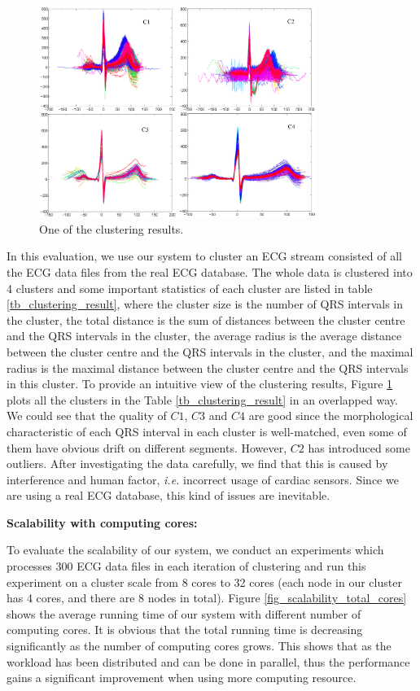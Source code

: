 \documentclass[conference]{IEEEtran}
\begin{document}
\begin{figure}[!t]
\centering
\includegraphics[height=2.7in]{./Figure/clustering_result.eps}
\caption{One of the clustering results.}
\label{fig_clustering_result}
\end{figure}

In this evaluation, we use our system to cluster an ECG stream consisted of all the ECG data files from the real ECG database. The whole data is clustered into 4 clusters and some important statistics of each cluster are listed in table \ref{tb_clustering_result}, where the cluster size is the number of QRS intervals in the cluster, the total distance is the sum of distances between the cluster centre and the QRS intervals in the cluster, the average radius is the average distance between the cluster centre and the QRS intervals in the cluster, and the maximal radius is the maximal distance between the cluster centre and the QRS intervals in this cluster. To provide an intuitive view of the clustering results, Figure \ref{fig_clustering_result} plots all the clusters in the Table \ref{tb_clustering_result} in an overlapped way. We could see that the quality of $ C1 $, $ C3 $ and $ C4 $ are good since the morphological characteristic of each QRS interval in each cluster is well-matched, even some of them have obvious drift on different segments. However, $ C2 $ has introduced some outliers. After investigating the data carefully, we find that this is caused by interference and human factor, \textit{i.e.} incorrect usage of cardiac sensors. Since we are using a real ECG database, this kind of issues are inevitable.


\textbf{Scalability with computing cores:}


To evaluate the scalability of our system, we conduct an experiments which processes 300 ECG data files in each iteration of clustering and run this experiment on a cluster scale from 8 cores to 32 cores (each node in our cluster has 4 cores, and there are 8 nodes in total). Figure \ref{fig_scalability_total_cores} shows the average running time of our system with different number of computing cores. It is obvious that the total running time is decreasing significantly as the number of computing cores grows. This shows that as the workload has been distributed and can be done in parallel, thus the performance gains a significant improvement when using more computing resource. 
\end{document}
